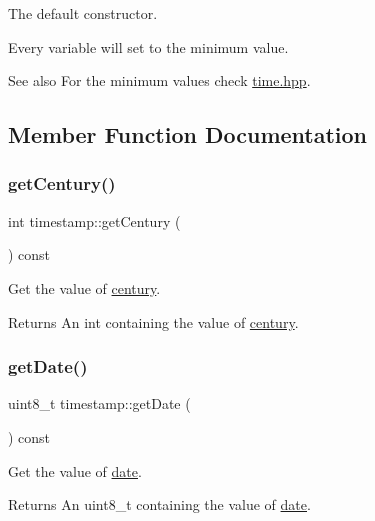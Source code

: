 The default constructor. 

Every variable will set to the minimum value. ~\newline
 \begin{DoxySeeAlso}{See also}
For the minimum values check \mbox{\hyperlink{time_8hpp_source}{time.\+hpp}}. 
\end{DoxySeeAlso}


\subsection{Member Function Documentation}
\mbox{\label{classtimestamp_a91ed1d395dd3d230607c4cb936b6004a}} 
\subsubsection{\texorpdfstring{get\+Century()}{getCentury()}}
{\footnotesize\ttfamily int timestamp\+::get\+Century (\begin{DoxyParamCaption}{ }\end{DoxyParamCaption}) const}



Get the value of \mbox{\hyperlink{classtimestamp_afe83888ffa38c1615a3d12b012f235b3}{century}}. 

\begin{DoxyReturn}{Returns}
An int containing the value of \mbox{\hyperlink{classtimestamp_afe83888ffa38c1615a3d12b012f235b3}{century}}. 
\end{DoxyReturn}
\mbox{\label{classtimestamp_a0ee0b3188b94fd8151f4525ea0de1078}} 
\subsubsection{\texorpdfstring{get\+Date()}{getDate()}}
{\footnotesize\ttfamily uint8\+\_\+t timestamp\+::get\+Date (\begin{DoxyParamCaption}{ }\end{DoxyParamCaption}) const}



Get the value of \mbox{\hyperlink{classtimestamp_a7eb2eee5f6ef4258aab7779a639a93fd}{date}}. 

\begin{DoxyReturn}{Returns}
An uint8\+\_\+t containing the value of \mbox{\hyperlink{classtimestamp_a7eb2eee5f6ef4258aab7779a639a93fd}{date}}. 
\end{DoxyReturn}
\mbox{\label{classtimestamp_a70baea53133ff4b05eb49332e3ef36bb}} 
